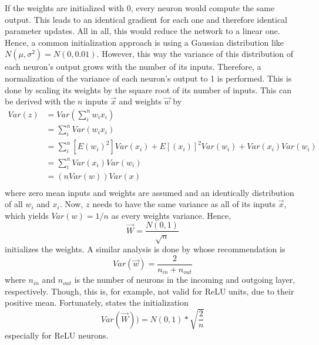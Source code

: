 If the weights are initialized with 0, every neuron would compute the same output.
This leads to an identical gradient for each one and therefore identical parameter updates.
All in all, this would reduce the network to a linear one.
Hence, a common initialization approach is using a Gaussian distribution like $N(\mu, \sigma^2) = N(0, 0.01)$.
However, this way the variance of this distribution of each neuron's output grows with the number of its inputs.
Therefore, a normalization of the variance of each neuron's output to 1 is performed.
This is done by scaling its weights by the square root of its number of inputs.
This can be derived with the $n$ inputs $\vec{x}$ and weights $\vec{w}$ by
\begin{align*}
	Var(z) &= Var \left( \sum_{i}^{n} w_i x_i \right) \\
	&= \sum_{i}^{n} Var \left( w_i x_i \right) \\
	&= \sum_{i}^{n} \left[ E(w_i)^2 \right] Var(x_i) + E \left[ (x_i) \right]^2 Var(w_i) + Var(x_i) Var(w_i) \\
	&= \sum_{i}^{n} Var(x_i) Var(w_i) \\
	&= (n Var(w)) Var(x) \\
\end{align*}
where zero mean inputs and weights are assumed and an identically distribution of all $w_i$ and $x_i$.
Now, $z$ needs to have the same variance as all of its inputs $\vec{x}$, which yields $Var(w) = 1/n$ as every weights variance.
Hence,
\begin{equation}
	\vec{W} = \frac{N(0,1)}{\sqrt{n}}
\end{equation}
initializes the weights.
A similar analysis is done by \cite{Glorot10understandingthe} whose recommendation is
\begin{equation*}
	Var(\vec{w}) = \frac{2}{n_{in} + n_{out}}
\end{equation*}
where $n_{in}$ and $n_{out}$ is the number of neurons in the incoming and outgoing layer, respectively.
Though, this is, for example, not valid for ReLU units, due to their positive mean.
Fortunately, \cite{DBLP:journals/corr/HeZR015} states the initialization
\begin{equation}
	Var(\vec{W})) = N(0,1) * \sqrt{\frac{2}{n}}
\end{equation}
especially for ReLU neurons.
